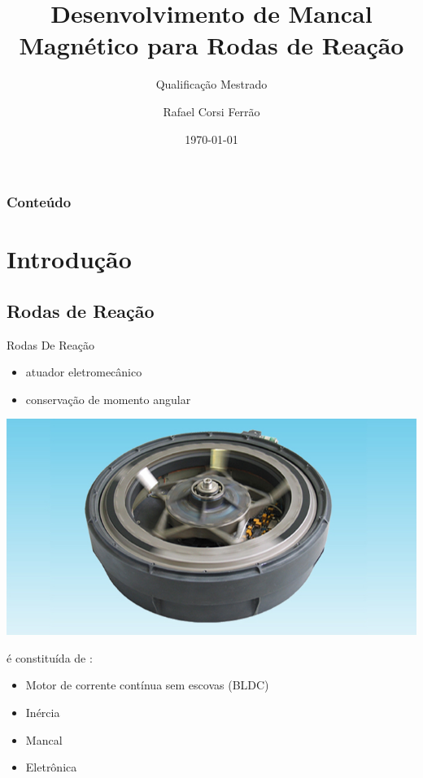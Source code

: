 \documentclass{beamer}
\title{Desenvolvimento de Mancal Magnético  para Rodas de Reação}
\subtitle{Qualificação Mestrado}
\author{Rafael Corsi Ferrão}
\date{\today}
\institute{\url{rafael.corsi@maua.br} \\\url{http://www.maua.br}}
\begin{document}
\begin{frame}[plain,t]
	\titlepage
\end{frame}

\begin{frame}
	\frametitle{Conteúdo}
		\tableofcontents
\end{frame}

\section{Introdução}

\subsection{Rodas de Reação}
\begin{frame}{Rodas De Reação}

	\begin{itemize}
		\item atuador eletromecânico
		\item conservação de momento angular
		
	\end{itemize}
	
	\begin{center}
	\includegraphics[width=0.5\linewidth]{MWI.jpg}
	\end{center}
	
	é constituída de :
	
	\begin{itemize}
		\item Motor de corrente contínua sem escovas (BLDC)
		\item Inércia
		\item Mancal
		\item Eletrônica
	\end{itemize}
\end{frame}
\end{document}
